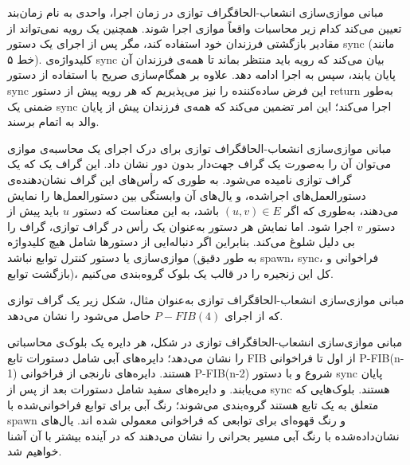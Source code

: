 \begin{itemframe-s}{مبانی موازی‌سازی انشعاب-الحاق}{گراف توازی}
\itm
در زمان اجرا، واحدی به نام زمان‌بند
تعیین می‌کند کدام زیر محاسبات
واقعاً موازی اجرا شوند.
\itm
همچنین یک رویه نمی‌تواند از مقادیر بازگشتی فرزندان خود استفاده کند، مگر پس از اجرای یک دستور sync (مانند خط ۵).
\itm
کلیدواژه‌ی sync بیان می‌کند که رویه باید منتظر بماند تا همه‌ی فرزندان آن پایان یابند، سپس به اجرا ادامه دهد.
\itm
علاوه بر همگام‌سازی صریح با استفاده از دستور sync این فرض ساده‌کننده را نیز می‌پذیریم که هر رویه پیش از دستور return به‌طور ضمنی یک sync اجرا می‌کند؛ این امر تضمین می‌کند که همه‌ی فرزندان پیش از پایان والد به اتمام برسند.
\end{itemframe-s}


\begin{itemframe-s}{مبانی موازی‌سازی انشعاب-الحاق}{گراف توازی}
\itm
برای درک اجرای یک محاسبه‌ی موازی می‌توان آن را به‌صورت یک گراف جهت‌دار بدون دور نشان داد. این گراف یک که یک گراف توازی
نامیده می‌شود.
\itm
به طوری که رأس‌های این گراف نشان‌دهنده‌ی دستورالعمل‌های اجراشده، و یال‌های آن وابستگی بین دستورالعمل‌ها را نمایش می‌دهند، به‌طوری که اگر
$(u, v) \in E$
باشد، به این معناست که دستور $u$ باید پیش از دستور $v$ اجرا شود.
\itm
اما نمایش هر دستور به‌عنوان یک رأس در گراف توازی، گراف را بی دلیل شلوغ می‌کند.
بنابراین اگر دنباله‌ایی از دستورها شامل هیچ کلیدواژه موازی‌سازی یا دستور کنترل توابع نباشد (به طور دقیق spawn، sync، فراخوانی و بازگشت توابع)، کل این زنجیره را در قالب یک بلوک
گروه‌بندی می‌کنیم.
\end{itemframe-s}


\begin{itemframe-s}{مبانی موازی‌سازی انشعاب-الحاق}{گراف توازی}
\itm
به‌عنوان مثال، شکل زیر یک گراف توازی که از اجرای
$P-FIB(4)$
حاصل می‌شود را نشان می‌دهد.
\end{itemframe-s}


\begin{itemframe-s}{مبانی موازی‌سازی انشعاب-الحاق}{گراف توازی}
\itm
در شکل، هر دایره یک بلوک‌ی محاسباتی را نشان می‌دهد؛ دایره‌های آبی شامل دستورات تابع FIB از اول تا فراخوانی P-FIB(n-1) هستند.
\itm
دایره‌های نارنجی از فراخوانی P-FIB(n-2) شروع و با دستور sync پایان می‌یابند.
و دایره‌های سفید شامل دستورات بعد از پس از sync  هستند.
 بلوک‌هایی که متعلق به یک تابع هستند گروه‌بندی می‌شوند؛ رنگ آبی برای توابع فراخوانی‌شده با spawn و رنگ قهوه‌ای برای توابعی که فراخوانی معمولی شده اند.
\itm
یال‌های نشان‌داده‌شده با رنگ آبی مسیر بحرانی را نشان می‌دهند که در آینده بیشتر با آن آشنا خواهیم شد.
\end{itemframe-s}


